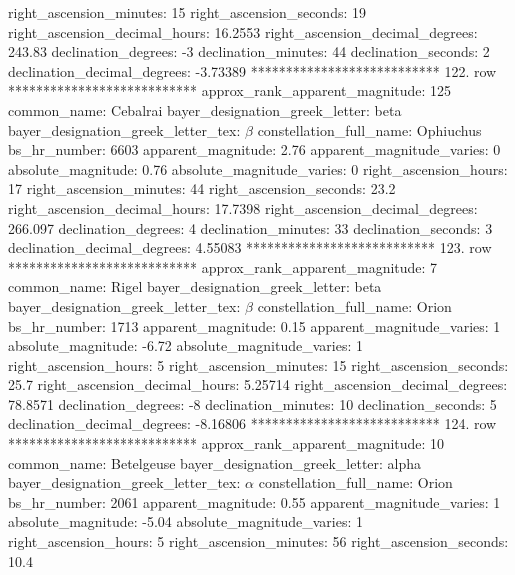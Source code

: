            right_ascension_minutes: 15
           right_ascension_seconds: 19
     right_ascension_decimal_hours: 16.2553
   right_ascension_decimal_degrees: 243.83
               declination_degrees: -3
               declination_minutes: 44
               declination_seconds: 2
       declination_decimal_degrees: -3.73389
*************************** 122. row ***************************
    approx_rank_apparent_magnitude: 125
                       common_name: Cebalrai
    bayer_designation_greek_letter: beta
bayer_designation_greek_letter_tex: $\beta$
           constellation_full_name: Ophiuchus
                      bs_hr_number: 6603
                apparent_magnitude: 2.76
         apparent_magnitude_varies: 0
                absolute_magnitude: 0.76
         absolute_magnitude_varies: 0
             right_ascension_hours: 17
           right_ascension_minutes: 44
           right_ascension_seconds: 23.2
     right_ascension_decimal_hours: 17.7398
   right_ascension_decimal_degrees: 266.097
               declination_degrees: 4
               declination_minutes: 33
               declination_seconds: 3
       declination_decimal_degrees: 4.55083
*************************** 123. row ***************************
    approx_rank_apparent_magnitude: 7
                       common_name: Rigel
    bayer_designation_greek_letter: beta
bayer_designation_greek_letter_tex: $\beta$
           constellation_full_name: Orion
                      bs_hr_number: 1713
                apparent_magnitude: 0.15
         apparent_magnitude_varies: 1
                absolute_magnitude: -6.72
         absolute_magnitude_varies: 1
             right_ascension_hours: 5
           right_ascension_minutes: 15
           right_ascension_seconds: 25.7
     right_ascension_decimal_hours: 5.25714
   right_ascension_decimal_degrees: 78.8571
               declination_degrees: -8
               declination_minutes: 10
               declination_seconds: 5
       declination_decimal_degrees: -8.16806
*************************** 124. row ***************************
    approx_rank_apparent_magnitude: 10
                       common_name: Betelgeuse
    bayer_designation_greek_letter: alpha
bayer_designation_greek_letter_tex: $\alpha$
           constellation_full_name: Orion
                      bs_hr_number: 2061
                apparent_magnitude: 0.55
         apparent_magnitude_varies: 1
                absolute_magnitude: -5.04
         absolute_magnitude_varies: 1
             right_ascension_hours: 5
           right_ascension_minutes: 56
           right_ascension_seconds: 10.4
